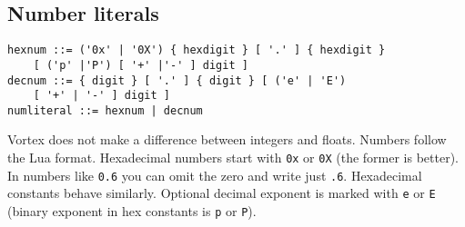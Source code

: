 \documentclass{article}
\begin{document}
\subsection{Number literals}
\begin{lstlisting}[language=bnf]
hexnum ::= ('0x' | '0X') { hexdigit } [ '.' ] { hexdigit }
    [ ('p' |'P') [ '+' |'-' ] digit ]
decnum ::= { digit } [ '.' ] { digit } [ ('e' | 'E')
    [ '+' | '-' ] digit ]
numliteral ::= hexnum | decnum
\end{lstlisting}
Vortex does not make a difference between integers and floats. Numbers follow
the Lua format. Hexadecimal numbers start with \verb|0x| or \verb|0X| (the
former is better). In numbers like \verb|0.6| you can omit the zero and write
just \verb|.6|. Hexadecimal constants behave similarly. Optional decimal
exponent is marked with \verb|e| or \verb|E| (binary exponent in hex constants
is \verb|p| or \verb|P|).
\end{document}
